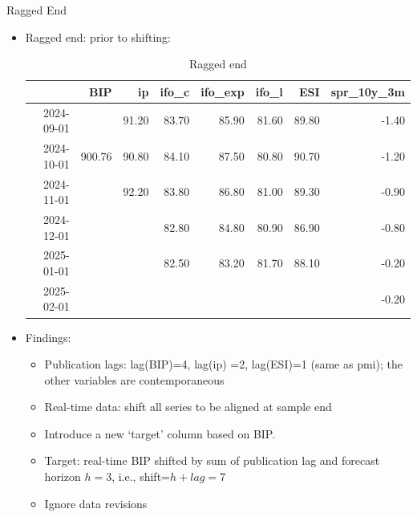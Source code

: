 \documentclass{beamer}
\begin{document}
\begin{frame} {Ragged End}
\begin{itemize}
\item Ragged end: prior to shifting:
\begin{table}[ht]
\centering
\begin{tabular}{rrrrrrrr}
  \hline
 & BIP & ip & ifo\_c & ifo\_exp & ifo\_l & ESI & spr\_10y\_3m \\ 
  \hline
2024-09-01 &  & 91.20 & 83.70 & 85.90 & 81.60 & 89.80 & -1.40 \\ 
  2024-10-01 & 900.76 & 90.80 & 84.10 & 87.50 & 80.80 & 90.70 & -1.20 \\ 
  2024-11-01 &  & 92.20 & 83.80 & 86.80 & 81.00 & 89.30 & -0.90 \\ 
  2024-12-01 &  &  & 82.80 & 84.80 & 80.90 & 86.90 & -0.80 \\ 
  2025-01-01 &  &  & 82.50 & 83.20 & 81.70 & 88.10 & -0.20 \\ 
  2025-02-01 &  &  &  &  &  &  & -0.20 \\ 
   \hline
\end{tabular}
\caption{Ragged end } 
\label{perf_var1}
\end{table}\item Findings:
\begin{itemize}
\item Publication lags: lag(BIP)=4, lag(ip) =2, lag(ESI)=1 (same as pmi); the other variables are contemporaneous
\item Real-time data: shift all series to be aligned at sample end
\item Introduce a new `target' column based on BIP. 
\item Target: real-time BIP shifted by sum of publication lag and forecast horizon $h=3$, i.e., shift=$h+lag=$7
\item Ignore data revisions 

\end{itemize}
\end{itemize}
\end{frame}
\end{document}
